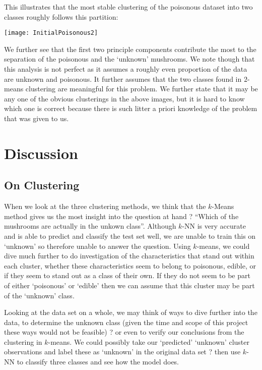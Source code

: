 \documentclass{article}
\begin{document}
This illustrates that the most stable clustering of the poisonous dataset into two classes roughly follows this partition:
\begin{center}
\texttt{[image: InitialPoisonous2]}
\end{center}

We further see that the first two principle components contribute the most to the separation of the poisonous and the `unknown' mushrooms. We note though that this analysis is not perfect as it assumes a roughly even proportion of the data are unknown and poisonous. It further assumes that the two classes found in $2$-means clustering are meaningful for this problem. We further state that it may be any one of the obvious clusterings in the above images, but it is hard to know which one is correct because there is such litter a priori knowledge of the problem that was given to us. 


\section{Discussion}

\subsection{On Clustering}
When we look at the three clustering methods, we think that the $k$-Means method gives us the most insight into the question at hand ? ``Which of the mushrooms are actually in the unkown class''. Although $k$-NN is very accurate and is able to predict and classify the test set well, we are unable to train this on `unknown' so therefore unable to answer the question. Using $k$-means, we could dive much further to do investigation of the characteristics that stand out within each cluster, whether these characteristics seem to belong to poisonous, edible, or if they seem to stand out as a class of their own. If they do not seem to be part of either `poisonous' or `edible' then we can assume that this cluster may be part of the `unknown' class. 

Looking at the data set on a whole, we may think of ways to dive further into the data, to determine the unknown class (given the time and scope of this project these ways would not be feasible) ? or even to verify our conclusions from the clustering in $k$-means. We could possibly take our `predicted' `unknown' cluster observations and label these as `unknown' in the original data set ? then use $k$-NN to classify three classes and see how the model does. 
\end{document}
